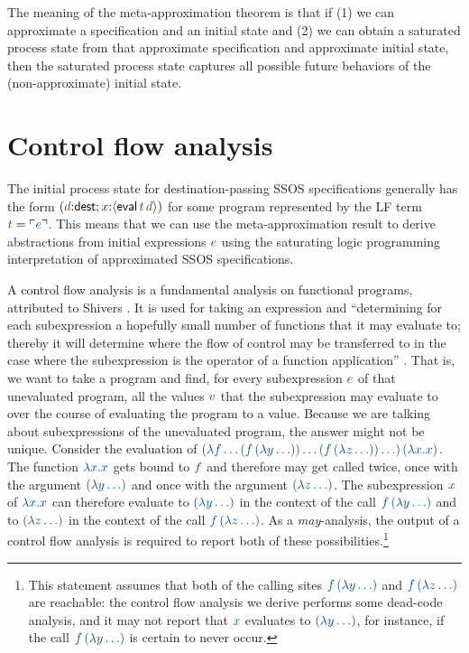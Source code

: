 The meaning of the meta-approximation theorem is that if (1) we can
approximate a specification and an initial state and (2) we can obtain
a saturated process state from that approximate specification
and approximate initial state, then the saturated process state captures
all possible future behaviors of the (non-approximate) initial state. 






\section{Control flow analysis}
\label{sec:0cfa}

The initial process state for destination-passing SSOS specifications
generally has the form 
$(\lf{d}{:}{\sf dest}; x{:}\susp{{\sf eval}\,\lf{t}\,\lf{d}})$
for some program represented by the LF term $\lf{t} = \interp{e}$. 
This means that we
can use the meta-approximation result to derive abstractions from
initial expressions $\obj{e}$ using the saturating logic programming
interpretation of approximated SSOS specifications.

A control flow analysis is a fundamental analysis on functional
programs, attributed to Shivers \cite{shivers88control}. It is used
for taking an expression and ``determining for each subexpression a
hopefully small number of functions that it may evaluate to; thereby
it will determine where the flow of control may be transferred to in
the case where the subexpression is the operator of a function
application'' \cite[p. 142]{nielson05principles}. That is, we want to
take a program and find, for every subexpression $\obj{e}$ of that
unevaluated program, all the values $\obj{v}$ that the subexpression
may evaluate to over the course of evaluating the program to a
value. Because we are talking about subexpressions of the unevaluated
program, the answer might not be unique. Consider the evaluation of
$\obj{(\lambda f\ldots (f\,(\lambda y\ldots)) \ldots (f\,(\lambda
  z\ldots)) \ldots )\,(\lambda x.x)}$. The function $\obj{\lambda
  x.x}$ gets bound to $\obj{f}$ and therefore may get called twice,
once with the argument $\obj{(\lambda y\ldots)}$ and once with the
argument $\obj{(\lambda z\ldots)}$. The subexpression $\obj{x}$ of
$\obj{\lambda x.x}$ can therefore evaluate to $\obj{(\lambda
  y\ldots)}$ in the context of the call $\obj{f\,(\lambda y\ldots)}$
and to $\obj{(\lambda z\ldots)}$ in the context of the call
$\obj{f\,(\lambda z\ldots)}$. As a {\it may}-analysis, the output of a
control flow analysis is required to report both of these
possibilities.\footnote{This statement assumes that both of the
  calling sites $\obj{f\,(\lambda y\ldots)}$ and $\obj{f\,(\lambda
    z\ldots)}$ are reachable: the control flow analysis we derive
  performs some dead-code analysis, and it may not report that
  $\obj{x}$ evaluates to $\obj{(\lambda y\ldots)}$, for instance, if
  the call $\obj{f\,(\lambda y\ldots)}$ is certain to never occur.}

